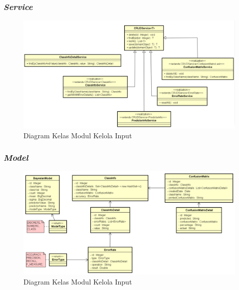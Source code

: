 \subsubsection{\textit{Service}}
\begin{figure}[H]
	\centering
	\includegraphics[scale=0.5]{ClassDiagramLengkap/Klasifikasi/Simple_CD_Klasifikasi_Services}
	\caption[Diagram Kelas Modul Kelola Input]{Diagram Kelas Modul Kelola Input}
	\label{fig:Diagram Kelas Modul Kelola Input}
\end{figure}

\subsubsection{\textit{Model}}
\begin{figure}[H]
	\centering
	\includegraphics[scale=0.5]{ClassDiagramLengkap/Klasifikasi/Simple_CD_Klasifikasi_Model}
	\caption[Diagram Kelas Modul Kelola Input]{Diagram Kelas Modul Kelola Input}
	\label{fig:Diagram Kelas Modul Kelola Input}
\end{figure}
